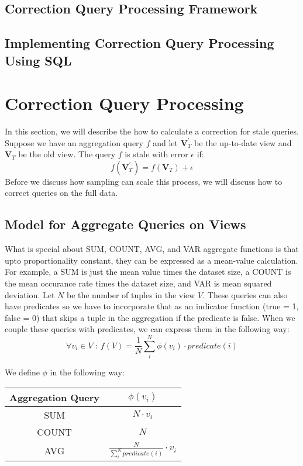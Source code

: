 \subsection{Correction Query Processing Framework}\label{subsec:framework}




\subsection{Implementing Correction Query Processing Using SQL}\label{subsec:impl-sql}
\fi




\iffalse

\section{Correction Query Processing}
In this section, we will describe the how to calculate a 
correction for stale queries.
Suppose we have an aggregation query $f$ and let $\textbf{V}_{T}^{'}$ be the up-to-date view
and $\textbf{V}_{T}$ be the old view. 
The query $f$ is stale with error $\epsilon$ if:
\[
f(\textbf{V}_{T}^{'})=f(\textbf{V}_{T})+\epsilon
\]
Before we discuss how sampling can scale this process, we will discuss how to correct
queries on the full data.

\subsection{Model for Aggregate Queries on Views}
What is special about SUM, COUNT, AVG, and VAR aggregate functions
is that upto proportionality constant, they can be expressed as a mean-value calculation.
For example, a SUM is just the mean value times the dataset size, a COUNT 
is the mean occurance rate times the dataset size, and VAR is mean squared 
deviation.
Let $N$ be the number of tuples in the view $V$. 
These queries can also have predicates so we have to incorporate that
as an indicator function (true = 1, false = 0) that skips a tuple in the aggregation if the predicate is false. 
When we couple these queries with predicates, we can express them in the 
following way:
\[
\forall v_i \in V \text{ : } f(V)= \frac{1}{N} \sum_i^N \phi(v_i) \cdot predicate(i)
\]

We define $\phi$ in the following way:
\begin{center}
\begin{tabular}{|c|c|}
\hline 
Aggregation Query & $\phi(v_i)$\tabularnewline
\hline 
\hline 
SUM & $N \cdot v_i$\tabularnewline
\hline 
COUNT & $N$\tabularnewline
\hline 
AVG & $\frac{N}{\sum_i^N predicate(i)} \cdot v_i$\tabularnewline
\hline 
\end{tabular}
\par\end{center}

